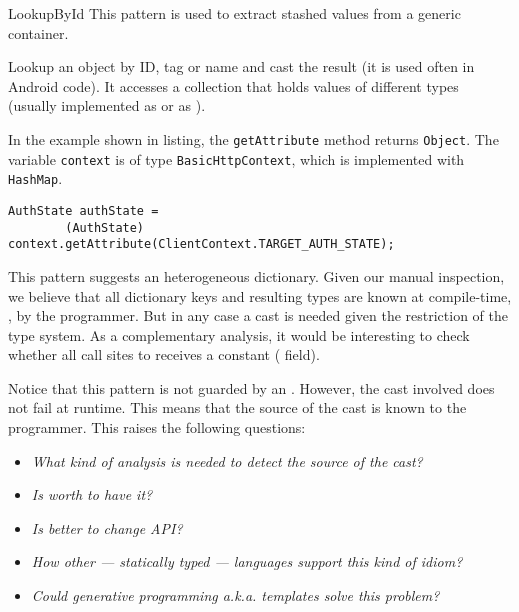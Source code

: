 \begin{pattern}{LookupById}
This pattern is used to extract stashed values from a generic container.

Lookup an object by ID, tag or name and cast the result
(it is used often in Android code).
It accesses a collection that holds values of different types
(usually implemented as  or as ).

\instances


In the example shown in listing,
the \texttt{getAttribute} method returns \texttt{Object}.
The variable \texttt{context} is of type \texttt{BasicHttpContext},
which is implemented with \texttt{HashMap}.

\begin{lstlisting}
AuthState authState =
        (AuthState) context.getAttribute(ClientContext.TARGET_AUTH_STATE);
\end{lstlisting}

\discussion

This pattern suggests an heterogeneous dictionary.
Given our manual inspection,
we believe that all dictionary keys and resulting types are known at
compile-time, \ie, by the programmer.
But in any case a cast is needed given the restriction of the type system.
As a complementary analysis,
it would be interesting to check whether all call sites to
 receives a constant ( field).

Notice that this pattern is not guarded by an .
However, the cast involved does not fail at runtime.
This means that the source of the cast is known to the programmer.
This raises the following questions:
\begin{itemize}
\item \emph{What kind of analysis is needed to detect the source of the cast?}
\item \emph{Is worth to have it?}
\item \emph{Is better to change API?}
\item \emph{How other --- statically typed --- languages support this kind of idiom?}
\item \emph{Could generative programming a.k.a. templates solve this problem?}
\end{itemize}

\end{pattern}